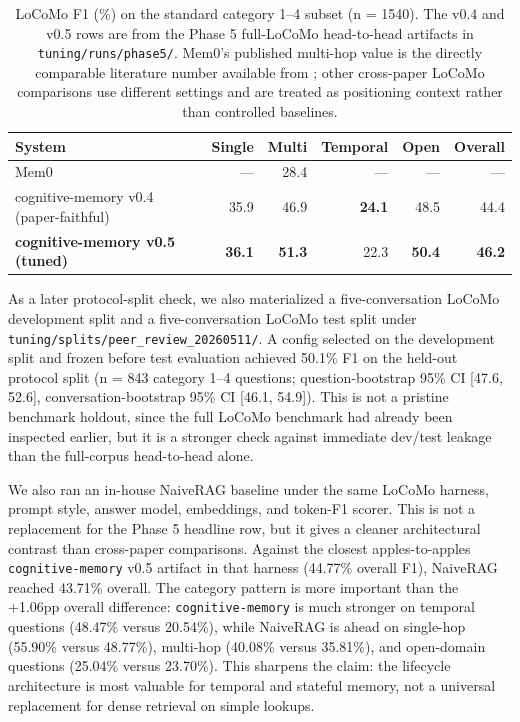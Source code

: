 \documentclass[11pt,a4paper]{article}
\begin{document}
\begin{table}[htbp]
\centering
\scriptsize
\begin{tabular}{@{}lrrrrr@{}}
\toprule
\textbf{System} & \textbf{Single} & \textbf{Multi} & \textbf{Temporal} & \textbf{Open} & \textbf{Overall} \\
\midrule
Mem0 \citep{chhikara2024mem0} & --- & 28.4 & --- & --- & --- \\
\midrule
cognitive-memory v0.4 (paper-faithful) & 35.9 & 46.9 & \textbf{24.1} & 48.5 & 44.4 \\
\textbf{cognitive-memory v0.5 (tuned)} & \textbf{36.1} & \textbf{51.3} & 22.3 & \textbf{50.4} & \textbf{46.2} \\
\bottomrule
\end{tabular}
\caption{LoCoMo F1 (\%) on the standard category 1--4 subset (n = 1540). The v0.4 and v0.5 rows are from the Phase 5 full-LoCoMo head-to-head artifacts in \texttt{tuning/runs/phase5/}. Mem0's published multi-hop value is the directly comparable literature number available from \citet{chhikara2024mem0}; other cross-paper LoCoMo comparisons use different settings and are treated as positioning context rather than controlled baselines.}
\label{tab:locomo}
\end{table}

As a later protocol-split check, we also materialized a five-conversation LoCoMo development split and a five-conversation LoCoMo test split under \texttt{tuning/splits/peer\_review\_20260511/}. A config selected on the development split and frozen before test evaluation achieved 50.1\% F1 on the held-out protocol split (n = 843 category 1--4 questions; question-bootstrap 95\% CI [47.6, 52.6], conversation-bootstrap 95\% CI [46.1, 54.9]). This is not a pristine benchmark holdout, since the full LoCoMo benchmark had already been inspected earlier, but it is a stronger check against immediate dev/test leakage than the full-corpus head-to-head alone.

We also ran an in-house NaiveRAG baseline under the same LoCoMo harness, prompt style, answer model, embeddings, and token-F1 scorer. This is not a replacement for the Phase 5 headline row, but it gives a cleaner architectural contrast than cross-paper comparisons. Against the closest apples-to-apples \texttt{cognitive-memory} v0.5 artifact in that harness (44.77\% overall F1), NaiveRAG reached 43.71\% overall. The category pattern is more important than the +1.06pp overall difference: \texttt{cognitive-memory} is much stronger on temporal questions (48.47\% versus 20.54\%), while NaiveRAG is ahead on single-hop (55.90\% versus 48.77\%), multi-hop (40.08\% versus 35.81\%), and open-domain questions (25.04\% versus 23.70\%). This sharpens the claim: the lifecycle architecture is most valuable for temporal and stateful memory, not a universal replacement for dense retrieval on simple lookups.
\end{document}
